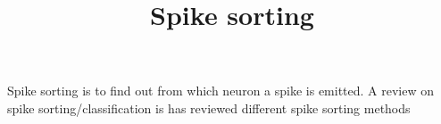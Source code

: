 \documentclass[a4paper]{article}
\title{Spike sorting}
\date{}
\begin{document}
    \maketitle
    
    Spike sorting is to find out from which neuron a spike is emitted.
    A review on spike sorting/classification is \cite{lewicki-1998-a-review-of-methods-for-spike-sorting-the-detection-and-classification-of-neural-action-potentials} has reviewed different spike sorting methods
    
    
    
\end{document}
